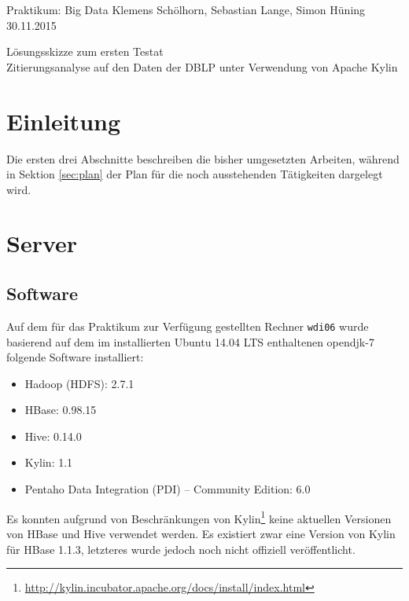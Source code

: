 \documentclass[a4paper,11pt,utf8]{scrartcl}
\begin{document}
\pagestyle{empty}

\noindent
Praktikum: Big Data \hfill Klemens Schölhorn, Sebastian Lange, Simon Hüning \hfill 30.11.2015\vspace{-.4cm}\\
\begin{center}
\huge\textsf{Lösungsskizze zum ersten Testat}\vspace{.1cm}\\
\large Zitierungsanalyse auf den Daten der DBLP unter Verwendung von Apache Kylin
\end{center}

\section*{Einleitung}

Die ersten drei Abschnitte beschreiben die bisher umgesetzten Arbeiten, während in Sektion \ref{sec:plan} der Plan für die noch ausstehenden Tätigkeiten dargelegt wird.

\section{Server}

\subsection{Software}

Auf dem für das Praktikum zur Verfügung gestellten Rechner \texttt{wdi06} wurde basierend auf dem im installierten Ubuntu 14.04 LTS enthaltenen opendjk-7 folgende Software installiert:

\begin{itemize}
    \item Hadoop (HDFS): 2.7.1
    \item HBase: 0.98.15
    \item Hive: 0.14.0
    \item Kylin: 1.1
    \item Pentaho Data Integration (PDI) -- Community Edition: 6.0
\end{itemize}

\noindent
Es konnten aufgrund von Beschränkungen von Kylin\footnote{\url{http://kylin.incubator.apache.org/docs/install/index.html}} keine aktuellen Versionen von HBase und Hive verwendet werden. Es existiert zwar eine Version von Kylin für HBase 1.1.3, letzteres wurde jedoch noch nicht offiziell veröffentlicht.
\end{document}
